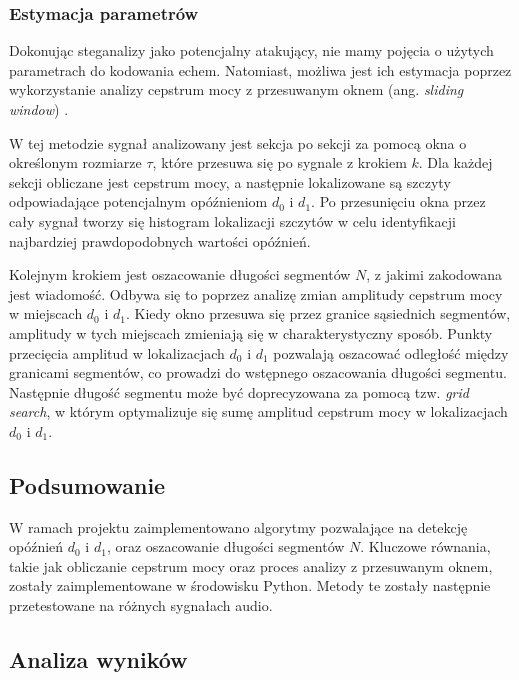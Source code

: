 
\subsubsection{Estymacja parametrów}

Dokonując steganalizy jako potencjalny atakujący, nie mamy pojęcia o użytych parametrach do kodowania echem. Natomiast, możliwa jest ich estymacja poprzez wykorzystanie analizy cepstrum mocy z przesuwanym oknem (ang. \textit{sliding window}) \cite{echo_swc}.

W tej metodzie sygnał analizowany jest sekcja po sekcji za pomocą okna o określonym rozmiarze $\tau$, które przesuwa się po sygnale z krokiem $k$. Dla każdej sekcji obliczane jest cepstrum mocy, a następnie lokalizowane są szczyty odpowiadające potencjalnym opóźnieniom $d_0$ i $d_1$. Po przesunięciu okna przez cały sygnał tworzy się histogram lokalizacji szczytów w celu identyfikacji najbardziej prawdopodobnych wartości opóźnień.



Kolejnym krokiem jest oszacowanie długości segmentów $N$, z jakimi zakodowana jest wiadomość. Odbywa się to poprzez analizę zmian amplitudy cepstrum mocy w miejscach $d_0$ i $d_1$. Kiedy okno przesuwa się przez granice sąsiednich segmentów, amplitudy w tych miejscach zmieniają się w charakterystyczny sposób. Punkty przecięcia amplitud w lokalizacjach $d_0$ i $d_1$ pozwalają oszacować odległość między granicami segmentów, co prowadzi do wstępnego oszacowania długości segmentu. Następnie długość segmentu może być doprecyzowana za pomocą tzw. \textit{grid search}, w którym optymalizuje się sumę amplitud cepstrum mocy w lokalizacjach $d_0$ i $d_1$.


\subsection{Podsumowanie}

W ramach projektu zaimplementowano algorytmy pozwalające na detekcję opóźnień $d_0$ i $d_1$, oraz oszacowanie długości segmentów $N$. Kluczowe równania, takie jak obliczanie cepstrum mocy oraz proces analizy z przesuwanym oknem, zostały zaimplementowane w środowisku Python. Metody te zostały następnie przetestowane na różnych sygnałach audio.


\subsection{Analiza wyników}
